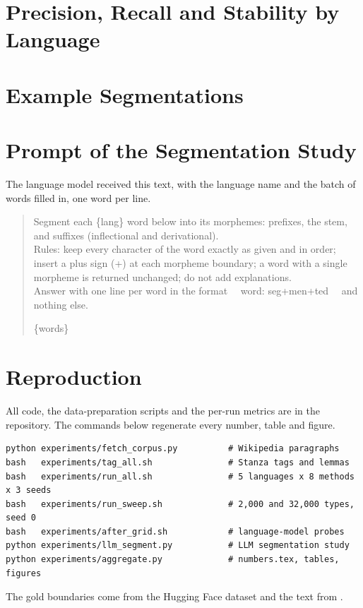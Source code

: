 \section{Precision, Recall and Stability by Language}\label{app:tables}






\section{Example Segmentations}\label{app:examples}


\section{Prompt of the Segmentation Study}\label{app:prompt}
The language model received this text, with the language name and the batch of words filled in, one word per line.
\begin{quote}\small\ttfamily\raggedright
Segment each \{lang\} word below into its morphemes: prefixes, the stem, and suffixes (inflectional and derivational).\\
Rules: keep every character of the word exactly as given and in order; insert a plus sign ({+}) at each morpheme boundary; a word with a single morpheme is returned unchanged; do not add explanations.\\
Answer with one line per word in the format \ \ word: seg{+}men{+}ted \ \ and nothing else.\par\medskip
\{words\}
\end{quote}

\section{Reproduction}\label{app:repro}
All code, the data-preparation scripts and the per-run metrics are in the repository.
The commands below regenerate every number, table and figure.
\begin{verbatim}
python experiments/fetch_corpus.py          # Wikipedia paragraphs
bash   experiments/tag_all.sh               # Stanza tags and lemmas
bash   experiments/run_all.sh               # 5 languages x 8 methods x 3 seeds
bash   experiments/run_sweep.sh             # 2,000 and 32,000 types, seed 0
bash   experiments/after_grid.sh            # language-model probes
python experiments/llm_segment.py           # LLM segmentation study
python experiments/aggregate.py             # numbers.tex, tables, figures
\end{verbatim}
The gold boundaries come from the Hugging Face dataset  and the text from .
